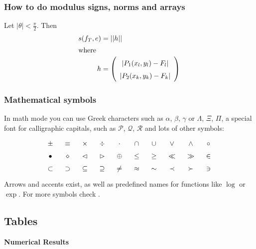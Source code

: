 \subsubsection{How to do modulus signs, norms and arrays}
Let $\left| \theta \right| < \frac{\pi}{2}$. Then
\begin{align}
 s(f_{T},e) &= \left| \left| {\boldmath h} \right| \right| \\
 \intertext{where}
 {\boldmath h} &= \left( 
   \begin{array}{c}
     \left| P_{1}(x_{l},y_{l}) - F_{l} \right| \\
     \left| P_{2}(x_{k},y_{k}) - F_{k} \right|
   \end{array}
 \right)
\end{align}

\subsubsection{Mathematical symbols} 
In math mode you can use Greek characters such as $\alpha$, $\beta$,
$\gamma$ or $\Lambda$, $\Xi$, $\Pi$, a special font for calligraphic
capitals, such as $\mathcal{P}$, $\mathcal{Q}$, $\mathcal{R}$ and lots
of other symbols:
\[\arraycolsep=3mm \renewcommand{\arraystretch}{1.5}
  \begin{array}{*{10}c}
    \pm & \equiv & \times & \div & \cdot & \cap & \cup & \vee & \wedge &\circ\\
    \bullet & \diamond & \lhd & \rhd & \oplus & \le & \ge & \ll & \gg & \in \\
    \subset & \supset & \subseteq & \supseteq & \ne & \approx & \sim & 
    \prec & \succ & \ni
  \end{array}
\]
Arrows and accents exist, as well as predefined names for functions like
$\log$ or $\exp$. For more symbols check \cite{symbols}.


\subsection{Tables}

\textbf{Numerical Results}

